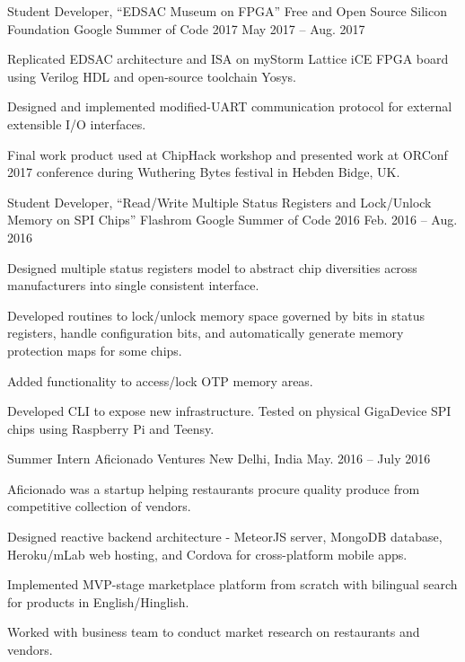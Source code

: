 
\begin{cventries}

\cventry
	{Student Developer, ``EDSAC Museum on FPGA''} %
	{Free and Open Source Silicon Foundation} %
	{Google Summer of Code 2017} %
	{May 2017 -- Aug. 2017} %
	{\begin{cvitems} %
		\item {Replicated EDSAC architecture and ISA on myStorm Lattice iCE FPGA board using Verilog HDL and open-source toolchain Yosys.}
		\item {Designed and implemented modified-UART communication protocol for external extensible I/O interfaces.}
		\item {Final work product used at ChipHack workshop and presented work at ORConf 2017 conference during Wuthering Bytes festival in Hebden Bidge, UK.}
	\end{cvitems}}

\cventry
	{Student Developer, ``Read/Write Multiple Status Registers and Lock/Unlock Memory on SPI Chips''} %
	{Flashrom} %
	{Google Summer of Code 2016} %
	{Feb. 2016 -- Aug. 2016} %
	{\begin{cvitems} %
		\item {Designed multiple status registers model to abstract chip diversities across manufacturers into single consistent interface.}
		\item {Developed routines to lock/unlock memory space governed by bits in status registers, handle configuration bits, and automatically generate memory protection maps for some chips.}
		\item {Added functionality to access/lock OTP memory areas.}
		\item {Developed CLI to expose new infrastructure. Tested on physical GigaDevice SPI chips using Raspberry Pi and Teensy.}
	\end{cvitems}}

\cventry
	{Summer Intern} %
	{Aficionado Ventures} %
	{New Delhi, India} %
	{May. 2016 -- July 2016} %
	{\begin{cvitems} %
		\item {Aficionado was a startup helping restaurants procure quality produce from competitive collection of vendors.}
		\item {Designed reactive backend architecture - MeteorJS server, MongoDB database, Heroku/mLab web hosting, and Cordova for cross-platform mobile apps.}
		\item {Implemented MVP-stage marketplace platform from scratch with bilingual search for products in English/Hinglish.}
		\item {Worked with business team to conduct market research on restaurants and vendors.}
	\end{cvitems}}

\end{cventries}
